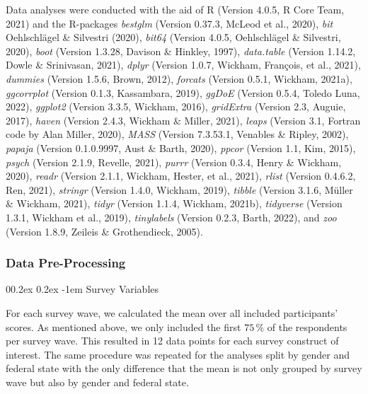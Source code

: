 \documentclass[
  english,
  jou,floatsintext]{apa7}
\makeatletter
\let\oldparagraph\paragraph
\renewcommand{\paragraph}[1]{\oldparagraph{#1}\mbox{}}
\renewcommand{\paragraph}{\@startsection{paragraph}{4}{\parindent}%
  {0\baselineskip \@plus 0.2ex \@minus 0.2ex}%
  {-1em}%
  {\normalfont\normalsize\bfseries\itshape\typesectitle}}
\makeatother
\begin{document}
Data analyses were conducted with the aid of R (Version 4.0.5, R Core Team, 2021) and the R-packages \emph{bestglm} (Version 0.37.3, McLeod et al., 2020), \emph{bit} Oehlschlägel \& Silvestri (2020), \emph{bit64} (Version 4.0.5, Oehlschlägel \& Silvestri, 2020), \emph{boot} (Version 1.3.28, Davison \& Hinkley, 1997), \emph{data.table} (Version 1.14.2, Dowle \& Srinivasan, 2021), \emph{dplyr} (Version 1.0.7, Wickham, François, et al., 2021), \emph{dummies} (Version 1.5.6, Brown, 2012), \emph{forcats} (Version 0.5.1, Wickham, 2021a), \emph{ggcorrplot} (Version 0.1.3, Kassambara, 2019), \emph{ggDoE} (Version 0.5.4, Toledo Luna, 2022), \emph{ggplot2} (Version 3.3.5, Wickham, 2016), \emph{gridExtra} (Version 2.3, Auguie, 2017), \emph{haven} (Version 2.4.3, Wickham \& Miller, 2021), \emph{leaps} (Version 3.1, Fortran code by Alan Miller, 2020), \emph{MASS} (Version 7.3.53.1, Venables \& Ripley, 2002), \emph{papaja} (Version 0.1.0.9997, Aust \& Barth, 2020), \emph{ppcor} (Version 1.1, Kim, 2015), \emph{psych} (Version 2.1.9, Revelle, 2021), \emph{purrr} (Version 0.3.4, Henry \& Wickham, 2020), \emph{readr} (Version 2.1.1, Wickham, Hester, et al., 2021), \emph{rlist} (Version 0.4.6.2, Ren, 2021), \emph{stringr} (Version 1.4.0, Wickham, 2019), \emph{tibble} (Version 3.1.6, Müller \& Wickham, 2021), \emph{tidyr} (Version 1.1.4, Wickham, 2021b), \emph{tidyverse} (Version 1.3.1, Wickham et al., 2019), \emph{tinylabels} (Version 0.2.3, Barth, 2022), and \emph{zoo} (Version 1.8.9, Zeileis \& Grothendieck, 2005).

\hypertarget{data-pre-processing}{%
\subsubsection{Data Pre-Processing}\label{data-pre-processing}}

\hypertarget{survey-variables-1}{%
\paragraph{Survey Variables}\label{survey-variables-1}}

For each survey wave, we calculated the mean over all included participants' scores. As mentioned above, we only included the first \(75\,\%\) of the respondents per survey wave. This resulted in 12 data points for each survey construct of interest.
The same procedure was repeated for the analyses split by gender and federal state with the only difference that the mean is not only grouped by survey wave but also by gender and federal state.
\end{document}
